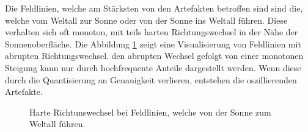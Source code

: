 Die Feldlinien, welche am Stärksten von den Artefakten betroffen sind sind die, welche vom Weltall zur Sonne oder von der Sonne ins Weltall führen. Diese verhalten sich oft monoton, mit teils harten Richtungswechsel in der Nähe der Sonnenoberfläche. Die Abbildung \ref{resultate:loesung1:dct:randbehandlung:harte_richtungswechsel} zeigt eine Visualisierung von Feldlinien mit abrupten Richtungswechsel. den abrupten Wechsel gefolgt von einer monotonen Steigung kann nur durch hochfrequente Anteile dargestellt werden. Wenn diese durch die Quantisierung an Genauigkeit verlieren, entstehen die oszillierenden Artefakte. 
\begin{figure}
	\caption{Harte Richtunswechsel bei Feldlinien, welche von der Sonne zum Weltall führen.}
	\label{resultate:loesung1:dct:randbehandlung:harte_richtungswechsel}
\end{figure}

